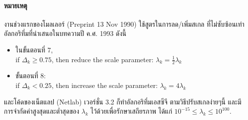 \paragraph{หมายเหตุ} งานช่วงแรกของโมลเลอร์ (Preprint 13 Nov 1990) 
ใช้สูตรในการลด/เพิ่มสเกล ที่ไม่ซับซ้อนเท่าอัลกอริทึ่มที่นำเสนอในบทความปี ค.ศ. 1993 \cite{Moller1993a} ดังนี้
\begin{itemize}
\item ในขั้นตอนที่ 7,\\
if $\Delta_k \geq 0.75$, then reduce the scale parameter: 
$\lambda_k = \frac{1}{2} \lambda_k$
\item ขั้นตอนที่ 8: \\
if $\Delta_k < 0.25$, then increase the scale parameter: 
$\lambda_k = 4 \lambda_k$
\end{itemize}
และโค้ดของเน็ตแลป (Netlab\cite{Netlab}) เวอร์ชั่น 3.2 ก็ทำอัลกอริทึ่มเอสซีจี ตามวิธีปรับสเกลง่ายๆนี้ และมีการจำกัดค่าสูงสุดและต่ำสุดของ $\lambda_k$ ไว้ด้วยเพื่อรักษาเสถียรภาพ
ได้แก่
$ 10^{-15} \leq \lambda_k \leq 10^{100}$.



